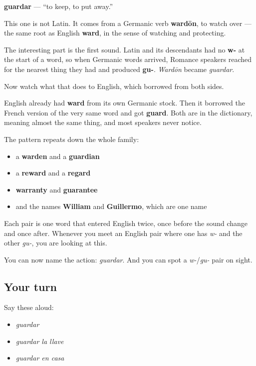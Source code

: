 \begin{cousinweb}
\textbf{guardar} — \textquotedblleft{}to keep, to put away.\textquotedblright{}

This one is not Latin. It comes from a Germanic verb \textbf{wardōn}, to watch over — the same root as English \textbf{ward}, in the sense of watching and protecting.

The interesting part is the first sound. Latin and its descendants had no \textbf{w-} at the start of a word, so when Germanic words arrived, Romance speakers reached for the nearest thing they had and produced \textbf{gu-}. \emph{Wardōn} became \emph{guardar}.

Now watch what that does to English, which borrowed from both sides.

English already had \textbf{ward} from its own Germanic stock. Then it borrowed the French version of the very same word and got \textbf{guard}. Both are in the dictionary, meaning almost the same thing, and most speakers never notice.

The pattern repeats down the whole family:

\begin{itemize}
\raggedright
  \item a \textbf{warden} and a \textbf{guardian}
  \item a \textbf{reward} and a \textbf{regard}
  \item \textbf{warranty} and \textbf{guarantee}
  \item and the names \textbf{William} and \textbf{Guillermo}, which are one name
\end{itemize}

Each pair is one word that entered English twice, once before the sound change and once after. Whenever you meet an English pair where one has \emph{w-} and the other \emph{gu-}, you are looking at this.
\end{cousinweb}

\begin{grammarlens}[title={What you've built}]
You can now name the action: \emph{guardar}. And you can spot a \emph{w-}/\emph{gu-} pair on sight.
\end{grammarlens}

\subsection*{Your turn}
Say these aloud:

\begin{itemize}
\raggedright
  \item \emph{guardar}
  \item \emph{guardar la llave}
  \item \emph{guardar en casa}
\end{itemize}

